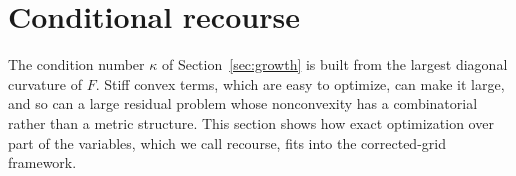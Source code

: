 \section{Conditional recourse}\label{sec:recourse}
The condition number $\kappa$ of Section~\ref{sec:growth} is built from the
largest diagonal curvature of $F$. Stiff convex terms, which are easy to
optimize, can make it large, and so can a large residual problem whose
nonconvexity has a combinatorial rather than a metric structure. This
section shows how exact optimization over part of the variables, which we
call recourse, fits into the corrected-grid framework.







